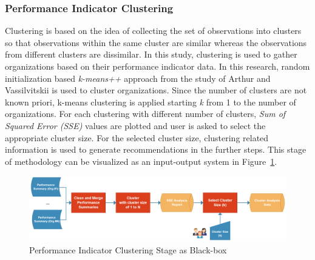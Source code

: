 \subsubsection{Performance Indicator Clustering}
\label{subsubsec:performance-indicator-clustering}
Clustering is based on the idea of collecting the set of observations into clusters so that observations within the same cluster are similar whereas the observations from different clusters are dissimilar. In this study, clustering is used to gather organizations based on their performance indicator data. In this research, random initialization based \textit{k-means++} approach from the study of Arthur and Vassilvitskii \cite{arthur2007} is used to cluster organizations. Since the number of clusters are not known priori, k-means clustering is applied starting \textit{k} from 1 to the number of organizations. For each clustering with different number of clusters, \textit{Sum of Squared Error (SSE)} values are plotted and user is asked to select the appropriate cluster size. For the selected cluster size, clustering related information is used to generate recommendations in the further steps. This stage of methodology can be visualized as an input-output system in Figure~\ref{fig:performance-indicator-clustering-blackbox}. 
\begin{figure}
  \centering
  \includegraphics[width=\textwidth]{4_methodology/performance-indicator-clustering-blackbox}
  \caption{Performance Indicator Clustering Stage as Black-box }
  \label{fig:performance-indicator-clustering-blackbox}
\end{figure}

